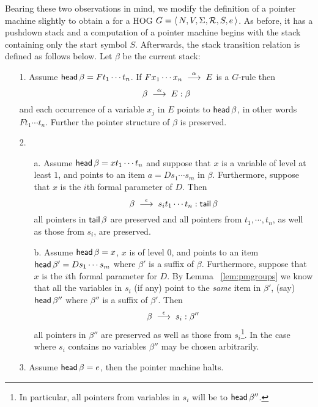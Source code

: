 Bearing these two observations in mind, we modify the definition of a
pointer machine slightly to obtain a  for a HOG $G = \langle\,{N, V, \Sigma, {\cal R}, S, e}\,\rangle$. As
before, it has a pushdown stack and a computation of a pointer machine
begins with the stack containing only the start symbol
$S$. Afterwards, the stack transition relation is defined as follows
below. Let $\beta$ be the current stack:
\begin{itemize}
\item[1.] Assume ${\sf head}\,{\beta} = F t_1 \cdots t_n$. If $F x_1
\cdots  x_n \; \stackrel{{\alpha}}{\longrightarrow} \; E$ is a $G$-rule then
\[\beta \; \stackrel{{\alpha}}{\longrightarrow} \; E: \beta \]
and each occurrence of a variable $x_j$ in $E$ points to
${\sf head}\,{\beta}$, in other words $F t_1 \cdots t_n$. Further the pointer
structure of $\beta$ is preserved.

\item[2.]
\begin{itemize}
\item[a.] Assume ${\sf head}\,{\beta} = x  t_1  \cdots  t_n$ and suppose
that $x$ is a variable of level at least $1$, and points to an
item $a = D s_1 \cdots s_m$ in $\beta$. Furthermore, suppose that
$x$ is the $i$th formal parameter of $D$. Then
\[ \beta \; \stackrel{{\epsilon}}{\longrightarrow} \; s_i t_1  \cdots  t_n : {\sf tail}\,{\beta}\]
all pointers in ${\sf tail}\,{\beta}$ are preserved and all pointers from
$t_1, \cdots, t_n$, as well as those from $s_i$, are preserved.

\item[b.] Assume ${\sf head}\,{\beta} = x$, $x$ is of level 0, and points
to an item ${\sf head}\,{\beta}' = D s_1 \cdots s_m$ where $\beta'$ is a
suffix of $\beta$. Furthermore, suppose that $x$ is the $i$th
formal parameter for $D$. By Lemma ~\ref{lem:pmgroups} we know
that all the variables in $s_i$ (if any) point to the \emph{same}
item in $\beta'$, (say) ${\sf head}\,{\beta}''$ where $\beta''$ is a
suffix of $\beta'$. Then
\[ \beta \; \stackrel{{\epsilon}}{\longrightarrow} \; s_i : {\beta''}\]
all pointers in ${\beta''}$ are preserved as well as those from
$s_i$\footnote{In particular, all pointers from variables in $s_i$ will
be to ${\sf head}\,{\beta}''$.}. In the case where $s_i$ contains no
variables $\beta''$ may be chosen arbitrarily.
\end{itemize}
%

\item[3.] Assume ${\sf head}\,{\beta} = e$, then the pointer machine halts.
\end{itemize}

